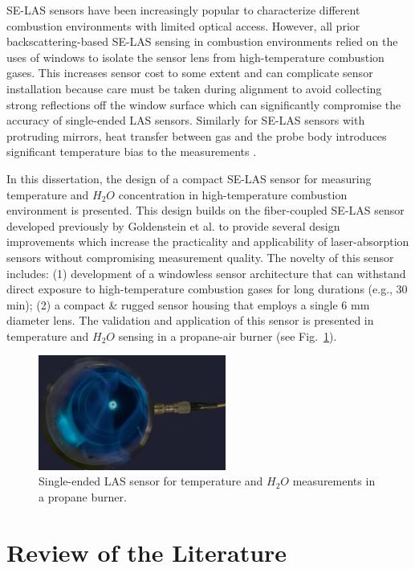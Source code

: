 SE-LAS sensors have been increasingly popular to characterize different combustion environments with limited optical access. However, all prior backscattering-based SE-LAS sensing in combustion environments relied on the uses of windows to isolate the sensor lens from high-temperature combustion gases. This increases sensor cost to some extent and can complicate sensor installation because care must be taken during alignment to avoid collecting strong reflections off the window surface which can significantly compromise the accuracy of single-ended LAS sensors. Similarly for SE-LAS sensors with protruding mirrors, heat transfer between gas and the probe body introduces significant temperature bias to the measurements \cite{Rein:10}. 

In this dissertation, the design of a compact SE-LAS sensor for measuring temperature and $H_2O$ concentration in high-temperature combustion environment is presented. This design builds on the fiber-coupled SE-LAS sensor developed previously by Goldenstein et al. \cite{Goldenstein:16} to provide several design improvements which increase the practicality and applicability of laser-absorption sensors without compromising measurement quality. The novelty of this sensor includes: (1) development of a windowless sensor architecture that can withstand direct exposure to high-temperature combustion gases for long durations (e.g., 30 min); (2) a compact \& rugged sensor housing that employs a single 6 mm diameter lens. The validation and application of this sensor is presented in temperature and $H_2O$ sensing in a propane-air burner (see Fig.\ \ref{fig:ch1_1}).

\vspace{15mm}
\begin{figure}[ht]
    \centering
        \includegraphics[width=0.55\textwidth]{fig/ch1_fig1.png}
        \caption{Single-ended LAS sensor for temperature and ${H_2}O$ measurements in a propane burner.}
    \label{fig:ch1_1}
\end{figure}

\section{Review of the Literature}
